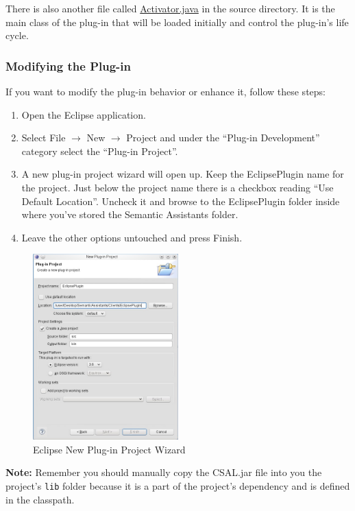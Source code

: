There is also another file called \url{Activator.java} in the source directory.
It is the main class of the plug-in that will be loaded initially and control
the plug-in's life cycle.

\subsubsection{Modifying the Plug-in}
If you want to modify the plug-in behavior or enhance it, follow these steps:
\begin{enumerate}
\item Open the Eclipse application.
\item Select File $\rightarrow$ New  $\rightarrow$ Project and under the
``Plug-in Development'' category select the ``Plug-in Project''.
\item A new plug-in project wizard will open up. Keep the EclipsePlugin name for
the project. Just below the project name there is a checkbox reading ``Use
Default Location''. Uncheck it and browse to the EclipsePlugin folder inside
where you've stored the Semantic Assistants folder.
\item Leave the other options untouched and press Finish.
\end{enumerate}

\begin{figure}[htb]
\begin{center}
  \includegraphics[width=0.5\textwidth]{pictures/eclipse_project_wizard.jpg}
  \caption{Eclipse New Plug-in Project Wizard}
  \label{fig:eclipse_project_wizard}
\end{center}
\end{figure}

\textbf{Note:} Remember you should manually copy the CSAL.jar file into you the
project's \texttt{lib} folder because it is a part of the project's dependency
and is defined in the classpath.

